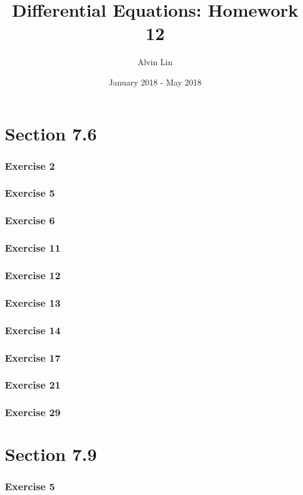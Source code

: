 \documentclass{math}
\title{Differential Equations: Homework 12}
\author{Alvin Lin}
\date{January 2018 - May 2018}
\begin{document}
\maketitle
\clearpage

\section*{Section 7.6}

\subsubsection{Exercise 2}
\subsubsection{Exercise 5}
\subsubsection{Exercise 6}
\subsubsection{Exercise 11}
\subsubsection{Exercise 12}
\subsubsection{Exercise 13}
\subsubsection{Exercise 14}
\subsubsection{Exercise 17}
\subsubsection{Exercise 21}
\subsubsection{Exercise 29}

\section*{Section 7.9}

\subsubsection*{Exercise 5}
\end{document}
